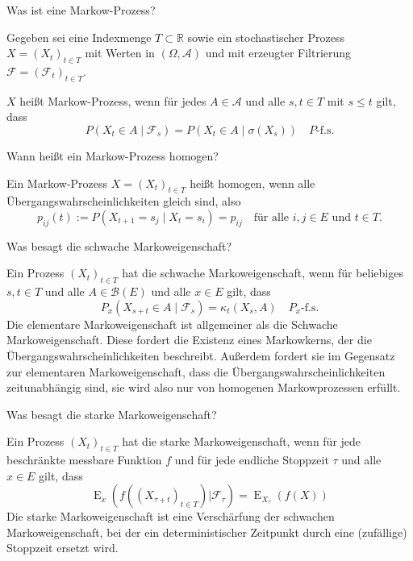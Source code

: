 \begin{QandA}
    \item Was ist eine Markow-Prozess?
    \begin{answered}
        Gegeben sei eine Indexmenge $T \subset \mathbb{R}$ sowie ein stochastischer Prozess $X = (X_{t})_{t\in T}$ mit Werten in $(\Omega ,{\mathcal{A}})$ und mit erzeugter Filtrierung $\mathcal{F} =({\mathcal{F}}_{t})_{t\in T}$.

        $X$ heißt Markow-Prozess, wenn für jedes $A \in{\mathcal{A}}$ und alle $s,t\in T$ mit $s\leq t$ gilt, dass
        \begin{equation}
            \tag{Gedächtnislosigkeit}
            P(X_{t}\in A\mid{\mathcal{F}}_{s})=P(X_{t}\in A\mid\sigma (X_{s})) \quad P\text{-f.s.}
        \end{equation}
    \end{answered}

    \item Wann heißt ein Markow-Prozess homogen?
    \begin{answered}
        Ein Markow-Prozess $X = (X_{t})_{t\in T}$ heißt homogen, wenn alle Übergangswahrscheinlichkeiten gleich sind, also
        \[
            p_{ij}(t) := P(X_{t+1} = s_j \mid X_t = s_i) = p_{ij} \quad \text{für alle } i,j \in E \text{ und } t \in T.
        \]
    \end{answered}

    \item Was besagt die schwache Markoweigenschaft?
    \begin{answered}
        Ein Prozess $(X_{t})_{t\in T}$ hat die schwache Markoweigenschaft, wenn für beliebiges $s, t \in T$ und alle $A \in{\mathcal{B}}(E)$ und alle $x \in E$ gilt, dass
        \[
            P_x(X_{s+t} \in A \mid{\mathcal{F}}_s) = \kappa_t(X_s, A) \quad P_x\text{-f.s.}
        \]
        Die elementare Markoweigenschaft ist allgemeiner als die Schwache Markoweigenschaft.
        Diese fordert die Existenz eines Markowkerns, der die Übergangswahrscheinlichkeiten beschreibt.
        Außerdem fordert sie im Gegensatz zur elementaren Markoweigenschaft, dass die Übergangswahrscheinlichkeiten zeitunabhängig sind, sie wird also nur von homogenen Markowprozessen erfüllt.
    \end{answered}

    \item Was besagt die starke Markoweigenschaft?
    \begin{answered}
        Ein Prozess $(X_{t})_{t\in T}$ hat die starke Markoweigenschaft, wenn für jede beschränkte messbare Funktion $f$ und für jede endliche Stoppzeit $\tau$ und alle $x\in E$ gilt, dass
        \[
            \operatorname{E}_{x}(f((X_{\tau +t})_{t\in T})|{\mathcal{F}}_{\tau})=\operatorname{E}_{X_{\tau}}(f(X))
        \]
        Die starke Markoweigenschaft ist eine Verschärfung der schwachen Markoweigenschaft, bei der ein deterministischer Zeitpunkt durch eine (zufällige) Stoppzeit ersetzt wird.
    \end{answered}


\end{QandA}
